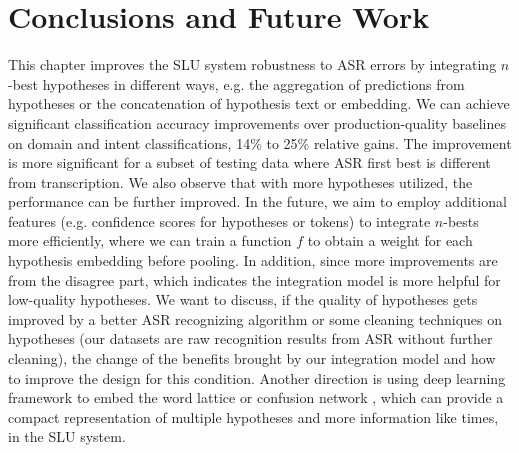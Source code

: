 \section{Conclusions and Future Work}
\label{speech:conclusion}
This chapter improves the SLU system robustness to ASR errors by integrating $n$-best hypotheses in different ways, e.g. the aggregation of predictions from hypotheses or the concatenation of hypothesis text or embedding. 
We can achieve significant classification accuracy improvements over production-quality baselines on domain and intent classifications, 14\% to 25\% relative gains.  The improvement is more significant for a subset of testing data where ASR first best is different from transcription. We also observe that with more hypotheses utilized, the performance can be further improved. 
In the future, we aim to employ additional features (e.g. confidence scores for hypotheses or tokens) to integrate $n$-bests more efficiently, where we can train a function $f$ to obtain a weight for each hypothesis embedding before pooling. 
In addition, since more improvements are from the disagree part, which indicates the integration model is more helpful for low-quality hypotheses. We want to discuss, if the quality of hypotheses gets improved by a better ASR recognizing algorithm or some cleaning techniques on hypotheses (our datasets are raw recognition results from ASR without further cleaning), the change of the benefits brought by our integration model and how to improve the design for this condition.
Another direction is using deep learning framework to embed the word lattice \citep{liu2014efficient} or confusion network \citep{hakkani2006beyond, tur2002improving}, which can provide a compact representation of multiple hypotheses and more information like times, in the SLU system. 



